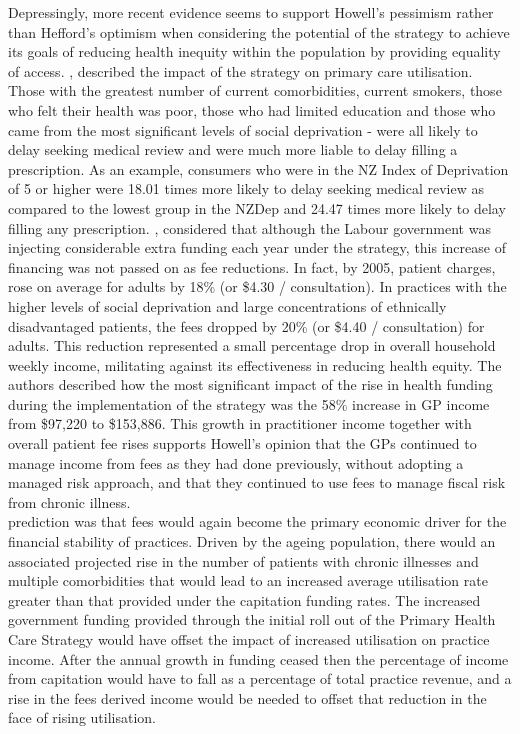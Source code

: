 \documentclass[11pt,a4paper]{article}
\begin{document}
Depressingly, more recent evidence seems to support Howell's pessimism rather than Hefford's optimism when considering the potential of the strategy to achieve its goals of reducing health inequity within the population by providing equality of access. \citet{jatrana2009primary}, described the impact of the strategy on primary care utilisation. Those with the greatest number of current comorbidities, current smokers, those who felt their health was poor, those who had limited education and those who came from the most significant levels of social deprivation - were all likely to delay seeking medical review and were much more liable to delay filling a prescription.  As an example, consumers who were in the NZ Index of Deprivation of 5 or higher were 18.01 times more likely to delay seeking medical review as compared to the lowest group in the NZDep and 24.47 times more likely to delay filling any prescription. \citet{cumming2008reforming}, considered  that although the Labour government was injecting considerable extra funding each year under the strategy, this increase of financing was not passed on as fee reductions.  In fact, by 2005, patient charges, rose on average for adults by 18\% (or \$4.30 / consultation). In practices with the higher levels of social deprivation and large concentrations of ethnically disadvantaged patients, the fees dropped by 20\% (or \$4.40 / consultation) for adults. This reduction represented a small percentage drop in overall household weekly income, militating against its effectiveness in reducing health equity.  The authors described how the most significant impact of the rise in health funding during the implementation of the strategy was the 58\% increase in GP income from \$97,220 to \$153,886. This growth in practitioner income together with overall patient fee rises supports Howell's opinion that the GPs continued to manage income from fees as they had done previously, without adopting a managed risk approach, and that they continued to use fees to manage fiscal risk from chronic illness. \\

\citet{howell2005restructuring} prediction was that fees would again become the primary economic driver for the financial stability of practices. Driven by the ageing  population, there would an associated projected rise in the number of patients with chronic illnesses and multiple comorbidities that would lead to an increased  average utilisation rate greater than that provided under the capitation funding rates. The increased government funding provided through the initial roll out of the Primary Health Care Strategy would have offset the impact of increased utilisation on practice income. After the annual growth in funding ceased then the percentage of income from capitation would have to fall as a percentage of total practice revenue, and a rise in the fees derived income would be needed to offset that reduction in the face of rising utilisation.\\
\end{document}

